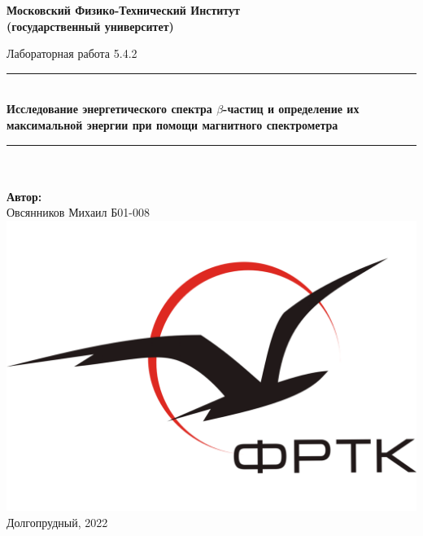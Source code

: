 \newcommand{\HRule}{\rule{\linewidth}{0.7mm}} %

\begin{center}
	\large\textbf{Московский Физико-Технический Институт}\\
	\large\textbf{(государственный университет)}
	
	\vfill
	
	
	
	\Large Лабораторная работа 5.4.2
	
	\HRule
	\\[0.4cm]
	{ \huge \bfseries Исследование энергетического спектра $\beta$-частиц и определение их максимальной энергии при помощи магнитного спектрометра}
	\\[0.4cm] %
	\HRule
	\\[0.5cm]
	
	\ \\
	\textbf{\large Автор:} \\	
	\large Овсянников Михаил Б01-008\\
	\vfill
	\hspace*{-0.8 cm}\includegraphics[width=100 pt]{./Include/frkt_logo.pdf}\\
	\large Долгопрудный, 2022
\end{center}

\thispagestyle{empty}

\newpage
\setcounter{page}{2}
\fancyfoot[c]{\thepage}
